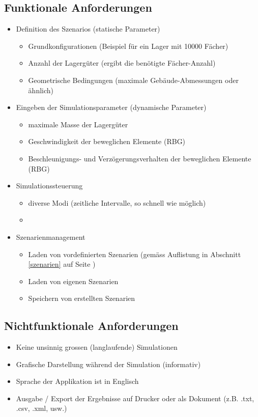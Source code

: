 \documentclass[11pt,a4paper]{article}
\begin{document}
\subsection{Funktionale Anforderungen}
\begin{itemize}
  \item Definition des Szenarios (statische Parameter)
  \begin{itemize}
    \item Grundkonfigurationen (Beispiel für ein Lager mit 10000 Fächer)
    \item Anzahl der Lagergüter (ergibt die benötigte Fächer-Anzahl)
    \item Geometrische Bedingungen (maximale Gebäude-Abmessungen oder ähnlich)
  \end{itemize}
  
  \item Eingeben der Simulationsparameter (dynamische Parameter)
    \begin{itemize}
    \item maximale Masse der Lagergüter
    \item Geschwindigkeit der beweglichen Elemente (RBG)
    \item Beschleunigungs- und Verzögerungsverhalten der beweglichen Elemente (RBG)
  \end{itemize}
  \item Simulationssteuerung
    \begin{itemize}
    \item diverse Modi (zeitliche Intervalle, so schnell wie möglich)
    \item 
  \end{itemize}
  \item Szenarienmanagement
    \begin{itemize}
    \item Laden von vordefinierten Szenarien (gemäss Auflistung in Abschnitt \ref{szenarien} auf Seite \pageref{szenarien})
    \item Laden von eigenen Szenarien
    \item Speichern von erstellten Szenarien
  \end{itemize}
\end{itemize}
%
\subsection{Nichtfunktionale Anforderungen}
\begin{itemize}
  \item Keine unsinnig grossen (langlaufende) Simulationen
  \item Grafische Darstellung während der Simulation (informativ)
  \item Sprache der Applikation ist in Englisch
  \item Ausgabe / Export der Ergebnisse auf Drucker oder als Dokument (z.B. .txt, .csv, .xml, usw.)
\end{itemize}
\end{document}
